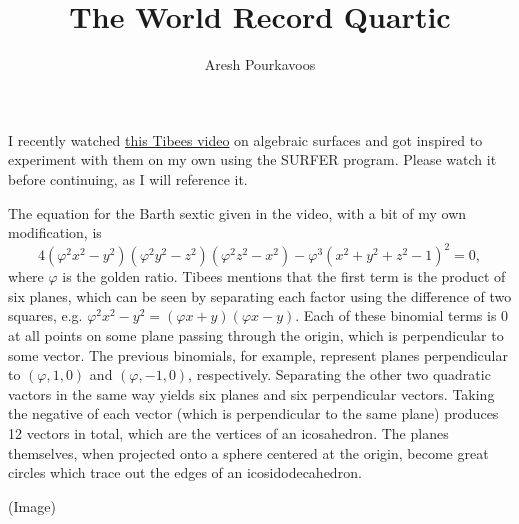\documentclass{article}
\begin{document}
\title{The World Record Quartic}
\author{Aresh Pourkavoos}
\maketitle

I recently watched \href{https://youtu.be/UVfR9u1TGW0}{this Tibees video} on algebraic surfaces
and got inspired to experiment with them on my own using the SURFER program.
Please watch it before continuing, as I will reference it.

The equation for the Barth sextic given in the video, with a bit of my own modification, is
$$4(\varphi^2x^2-y^2)(\varphi^2y^2-z^2)(\varphi^2z^2-x^2)-\varphi^3(x^2+y^2+z^2-1)^2=0,$$
where $\varphi$ is the golden ratio.
Tibees mentions that the first term is the product of six planes,
which can be seen by separating each factor using the difference of two squares,
e.g. $\varphi^2x^2-y^2 = (\varphi x+y)(\varphi x-y)$.
Each of these binomial terms is 0 at all points on some plane passing through the origin,
which is perpendicular to some vector.
The previous binomials, for example, represent planes
perpendicular to $(\varphi, 1, 0)$ and $(\varphi, -1, 0)$, respectively.
Separating the other two quadratic vactors in the same way yields
six planes and six perpendicular vectors.
Taking the negative of each vector (which is perpendicular to the same plane)
produces 12 vectors in total, which are the vertices of an icosahedron.
The planes themselves, when projected onto a sphere centered at the origin,
become great circles which trace out the edges of an icosidodecahedron.

(Image)
\end{document}
